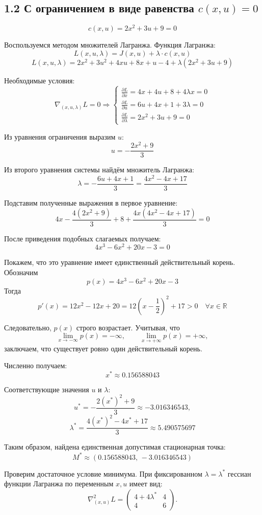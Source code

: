 \subsection*{1.2 С ограничением в виде равенства $c(x,u)=0$}
\[
c(x,u) = 2x^2 + 3u + 9 = 0
\]

Воспользуемся методом множителей Лагранжа. Функция Лагранжа:
\[
L(x,u,\lambda) = J(x,u) + \lambda \cdot c(x,u)
\]
\[
L(x,u,\lambda) = 2x^2 + 3u^2 + 4xu + 8x + u - 4 + \lambda(2x^2 + 3u + 9)
\]

Необходимые условия:
\[
\nabla_{(x,u,\lambda)}L = 0 \Rightarrow
\begin{cases}
\frac{\partial L}{\partial x} = 4x + 4u + 8 + 4\lambda x = 0 \\[2ex]
\frac{\partial L}{\partial u} = 6u + 4x + 1 + 3\lambda = 0 \\[2ex]
\frac{\partial L}{\partial \lambda} = 2x^2 + 3u + 9 = 0
\end{cases}
\]




Из уравнения ограничения выразим \(u\):
\[
u=-\frac{2x^2+9}{3}
\]

Из второго уравнения системы найдём множитель Лагранжа:
\[
\lambda=-\frac{6u+4x+1}{3}
=\frac{4x^2-4x+17}{3}
\]

Подставим полученные выражения в первое уравнение:
\[
4x-\frac{4(2x^2+9)}{3}+8
+\frac{4x(4x^2-4x+17)}{3}=0
\]

После приведения подобных слагаемых получаем:
\[
4x^3-6x^2+20x-3=0
\]

Покажем, что это уравнение имеет единственный действительный корень.
Обозначим
\[
p(x)=4x^3-6x^2+20x-3
\]
Тогда
\[
p'(x)=12x^2-12x+20
=12\left(x-\frac12\right)^2+17>0
\quad \forall x\in\mathbb R
\]

Следовательно, \(p(x)\) строго возрастает. Учитывая, что
\[
\lim_{x\to-\infty}p(x)=-\infty,
\qquad
\lim_{x\to+\infty}p(x)=+\infty,
\]
заключаем, что существует ровно один действительный корень.

Численно получаем:
\[
x^*\approx0.156588043
\]

Соответствующие значения \(u\) и \(\lambda\):
\[
u^*=-\frac{2(x^*)^2+9}{3}
\approx-3.016346543,
\]
\[
\lambda^*=\frac{4(x^*)^2-4x^*+17}{3}
\approx5.490575697
\]

Таким образом, найдена единственная допустимая стационарная точка:
\[
M^*\approx(0.156588043,\,-3.016346543)
\]

Проверим достаточное условие минимума.
При фиксированном \(\lambda=\lambda^*\) гессиан функции
Лагранжа по переменным \(x,u\) имеет вид:
\[
\nabla^2_{(x,u)}L=
\begin{pmatrix}
4+4\lambda^* & 4\\
4 & 6
\end{pmatrix}.
\]

